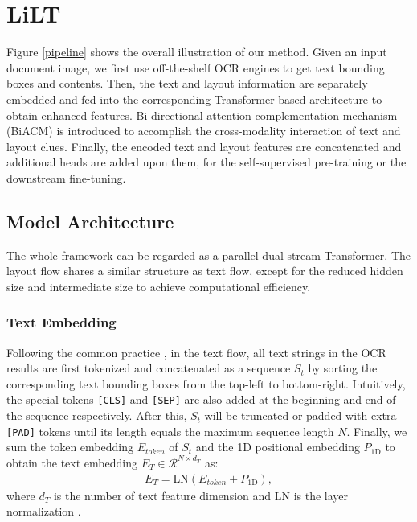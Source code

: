 \documentclass[11pt]{article}
\begin{document}
\section{LiLT}
Figure \ref{pipeline} shows the overall illustration of our method. Given an input  document image, we first use off-the-shelf OCR engines to get  text bounding boxes and  contents. Then, the text and layout information are separately embedded and fed into the corresponding Transformer-based architecture to obtain enhanced features. 
Bi-directional attention complementation mechanism (BiACM) is introduced to  accomplish the cross-modality interaction of text and layout clues.
Finally, the  encoded text and layout features are concatenated and additional heads are added upon them, for the self-supervised pre-training or the downstream fine-tuning.

\subsection{Model Architecture}
The whole framework can be regarded as a parallel dual-stream Transformer. The layout flow shares a similar structure as text flow, except for the reduced hidden size and intermediate size to achieve computational efficiency.

\subsubsection{Text  Embedding}
Following the common practice \cite{devlin2019bert,Layoutlm}, in the text flow, all text strings in the OCR results are first tokenized and concatenated as a sequence $S_t$ by sorting the corresponding text bounding boxes from the top-left to bottom-right. Intuitively, the special tokens \texttt{[CLS]} and \texttt{[SEP]} are also added at the beginning and end of the sequence respectively.  After this, $S_t$ will be truncated or padded with extra \texttt{[PAD]} tokens until its length equals  the maximum sequence length $N$. Finally, we sum the  token embedding $E_{token}$ of $S_t$ and the 1D positional embedding $P_{1\mathrm{D}}$ to obtain the text embedding $E_{T}\in\mathcal{R}^{N\times d_T}$  as:
\begin{align}
    E_{T} = \mathrm{LN}(E_{token} + P_{1\mathrm{D}}),
\end{align}where $d_T$ is the number of text feature dimension and $\mathrm{LN}$ is the layer normalization \cite{ln}.
\end{document}
